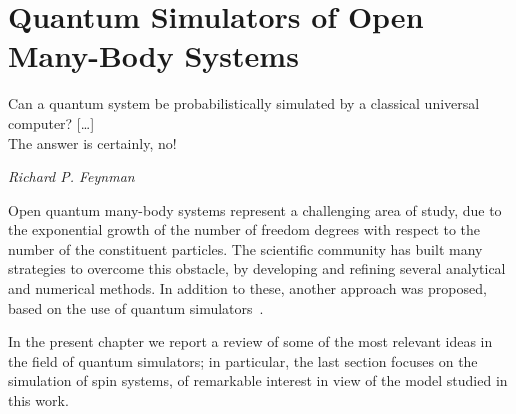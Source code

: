 
\chapter{Quantum Simulators of Open Many-Body Systems}
\label{chapter2}
\epigraph{Can a quantum system be probabilistically simulated by a classical universal computer? [\dots] \\The answer is certainly, no!}{\textit{Richard P. Feynman}}

Open quantum many-body systems represent a challenging area of study, due to the exponential growth of the number of freedom degrees with respect to the number of the constituent particles. The scientific community has built many strategies to overcome this obstacle, by developing and refining several analytical and numerical methods. In addition to these, another approach was proposed, based on the use of quantum simulators~\cite{quantum_sim_feynman}.

In the present chapter we report a review of some of the most relevant ideas in the field of quantum simulators; in particular, the last section focuses on the simulation of spin systems, of remarkable interest in view of the model studied in this work.

